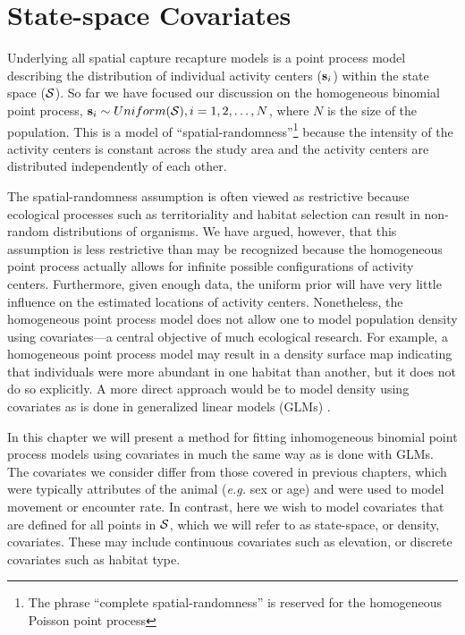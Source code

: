 


\chapter{State-space Covariates}
\label{chapt.state-space}

\vspace{0.3cm}

Underlying all spatial capture recapture models is a point process
model describing the distribution of individual activity
centers (${\bf s}_i$) within the state space ($\cal{S}$). So far we have focused our
discussion on the homogeneous binomial point process,
${\bf s}_i \sim Uniform({\cal S}), i=1,2,\dots,N$, where $N$ is the
size of the population. This is a model of
``spatial-randomness''\footnote{The phrase ``complete
  spatial-randomness'' is reserved for the homogeneous Poisson point
  process}
because the intensity of the
activity centers is constant across the study area and the activity
centers are distributed independently of each other.

The spatial-randomness assumption is often viewed as restrictive
because ecological processes such as
territoriality and habitat selection can result in non-random
distributions of organisms. We have argued, however, that this
assumption is less restrictive than may be recognized because the
homogeneous point process actually allows for infinite
possible configurations of activity centers. Furthermore, given enough data,
the uniform prior will have very little influence on the estimated
locations of activity centers. Nonetheless, the homogeneous point
process model does not allow one to model population density using
covariates---a central objective of much ecological research.
For example, a homogeneous point process model
may result in a density surface map indicating that individuals were
more abundant in one habitat than another, but it does not do so
explicitly. A more direct approach would be to model density using
covariates as is done in generalized linear models (GLMs)
\citep{mccullagh_nelder:1989}. %

In this chapter we will present a method
for fitting inhomogeneous binomial point process models using
covariates in much the same way as is done with GLMs. The
covariates we consider differ
from those covered in previous chapters, which were typically
attributes of the animal ({\it e.g.} sex or age) and were used to model movement or encounter
rate. In contrast, here we wish to
model covariates that are defined for all points in
$\cal{S}$, which we will refer to as
state-space, or density, covariates. These may
include continuous covariates such as elevation, or discrete
covariates such as habitat type.

